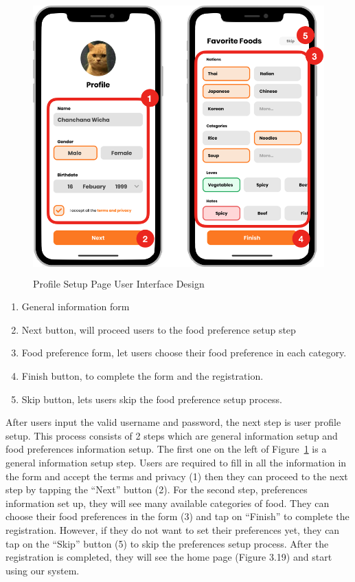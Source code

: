 \documentclass[12pt,oneside,openright,a4paper]{cpe-english-project}
\begin{document}
\newpage
\begin{figure}[H]\centering
\includegraphics[height=300pt]{./images/3ui_ProfileSetupPageUserInterfaceDesign.png}
\caption{Profile Setup Page User Interface Design}\label{fig:3ui_ProfileSetupPageUserInterfaceDesign}
\end{figure}
\begin{enumerate}
\item General information form
\item Next button, will proceed users to the food preference setup step
\item Food preference form, let users choose their food preference in each category.
\item Finish button, to complete the form and the registration.
\item Skip button, lets users skip the food preference setup process.
\end{enumerate}
After users input the valid username and password, the next step is user profile setup. This process consists of 2 steps which are general information setup and food preferences information setup. The first one on the left of Figure~\ref{fig:3ui_ProfileSetupPageUserInterfaceDesign} is a general information setup step. Users are required to fill in all the information in the form and accept the terms and privacy (1) then they can proceed to the next step by tapping the “Next” button (2). For the second step, preferences information set up, they will see many available categories of food. They can choose their food preferences in the form (3) and tap on “Finish” to complete the registration. However, if they do not want to set their preferences yet, they can tap on the “Skip” button (5) to skip the preferences setup process. After the registration is completed, they will see the home page (Figure 3.19) and start using our system.
\newpage
\end{document}
